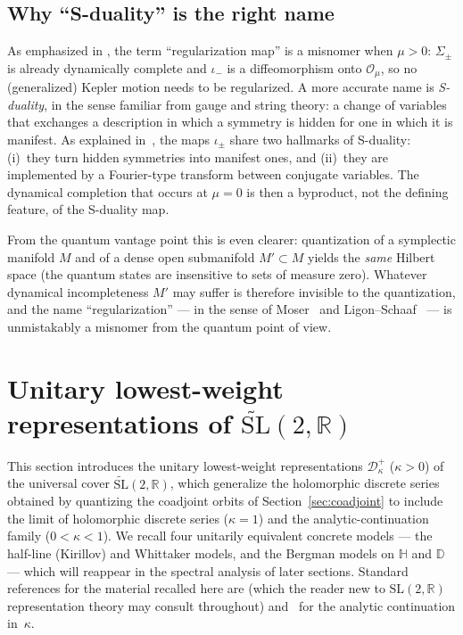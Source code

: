 \documentclass[11pt]{article}
\theoremstyle{plain}
\theoremstyle{definition}
\theoremstyle{remark}
\newcommand{\R}{\mathbb{R}}
\newcommand{\HH}{\mathbb{H}}
\newcommand{\SL}{\mathrm{SL}}
\newcommand{\SLt}{\widetilde{\mathrm{SL}}}
\newcommand{\OO}{\mathcal{O}}
\newcommand{\D}{\mathcal{D}}
\newcommand{\DD}{\mathbb{D}}
\begin{document}
\subsection{Why ``S-duality'' is the right name}

As emphasized in \cite{MMX2025}, the term ``regularization map'' is a misnomer
when $\mu>0$: $\Sigma_{\pm}$ is already dynamically complete and $\iota_{-}$
is a diffeomorphism onto $\OO_{\mu}$, so no (generalized) Kepler motion needs to be regularized.
A more accurate name is \emph{S-duality}, in the sense familiar from
gauge and string theory: a change of variables that exchanges a
description in which a symmetry is hidden for one in which it is
manifest. As explained in~\cite{MMX2025}, the maps $\iota_{\pm}$ share
two hallmarks of S-duality: (i)~they turn hidden symmetries into manifest
ones, and (ii)~they are implemented by a Fourier-type transform between
conjugate variables. The dynamical completion that occurs at $\mu=0$ is
then a byproduct, not the defining feature, of the S-duality map.

From the quantum vantage point this is even clearer: quantization of
a symplectic manifold $M$ and of a dense open submanifold $M'\subset M$
yields the \emph{same} Hilbert space (the quantum states are insensitive to
sets of measure zero). Whatever dynamical incompleteness $M'$ may suffer is
therefore invisible to the quantization, and the name ``regularization'' --- in
the sense of Moser~\cite{Moser1970} and Ligon--Schaaf~\cite{LigonSchaaf1976} ---
is unmistakably a misnomer from the quantum point of view.

\section{Unitary lowest-weight representations of \texorpdfstring{$\SLt(2,\R)$}{SL\textasciitilde(2,R)}}\label{sec:discrete}

This section introduces the unitary lowest-weight representations
$\D^{+}_{\kappa}$ ($\kappa>0$) of the universal cover $\SLt(2,\R)$,
which generalize the holomorphic discrete series obtained by quantizing the coadjoint
orbits of Section~\ref{sec:coadjoint} to include the limit of holomorphic discrete
series ($\kappa=1$) and the analytic-continuation family ($0<\kappa<1$).
We recall four unitarily equivalent concrete models --- the half-line
(Kirillov) and Whittaker models, and the Bergman models on $\HH$ and $\DD$
--- which will reappear in the spectral analysis of later sections.
Standard references for the material recalled here are
\cite{HoweTan1992} (which the reader new to $\SL(2,\R)$ representation
theory may consult throughout) and~\cite{Sally1967} for the analytic
continuation in~$\kappa$.
\end{document}
